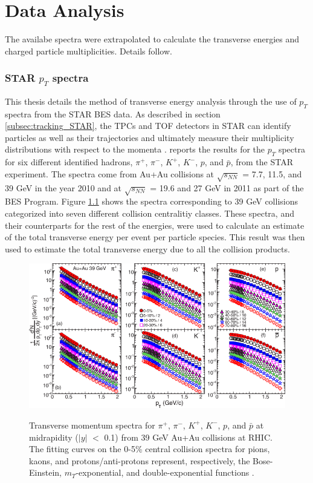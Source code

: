 \chapter{Data Analysis} \label{ch:analysis}
The availabe spectra were extrapolated to calculate the transverse energies and charged particle multiplicities. Details follow.

\subsection{STAR $p_{T}$ spectra}
This thesis details the method of transverse energy analysis through the use of $p_{T}$ spectra from the STAR BES data. As described in section \ref{subsec:tracking_STAR}, the TPCs and TOF detectors in STAR can identify particles as well as their trajectories and ultimately measure their multiplicity distributions with respect to the momenta \citet{PhysRevC.96.044904????}. reports the results for the $p_{T}$ spectra for six different identified hadrons, $\pi^+$, $\pi^-$, $K^+$, $K^-$, $p$, and $\bar{p}$, from the STAR experiment. The spectra come from Au+Au collisions at $\sqrt{s_{NN}}$ = 7.7, 11.5, and 39 GeV in the year 2010 and at $\sqrt{s_{NN}}$ = 19.6 and 27 GeV in 2011 as part of the BES Program. Figure \ref{fig:BESPaper_pTSpectra} \cite{PhysRevC.96.044904} shows the spectra corresponding to 39 GeV collisions categorized into seven different collision centralitiy classes. These spectra, and their counterparts for the rest of the energies, were used to calculate an estimate of the total transverse energy per event per particle species. This result was then used to estimate the total transverse energy due to all the collision products.
\begin{figure}[h]
  \centering
  \includegraphics[width=6.5in]{../figures/PhysRevC-96-044904_pTSpectra_39.png}\\
  \caption{Transverse momentum spectra for $\pi^{+}$, $\pi^{-}$, $K^+$, $K^{-}$, $p$, and $\bar{p}$ at midrapidity ($|y|$ $<$ 0.1) from 39 GeV Au+Au collisions at RHIC. The fitting curves on the 0-5\% central collision spectra for pions, kaons, and protons/anti-protons represent, respectively, the Bose-Einstein, $m_{T}$-exponential, and double-exponential functions \cite{PhysRevC.96.044904}.}\label{fig:BESPaper_pTSpectra}
\end{figure}

